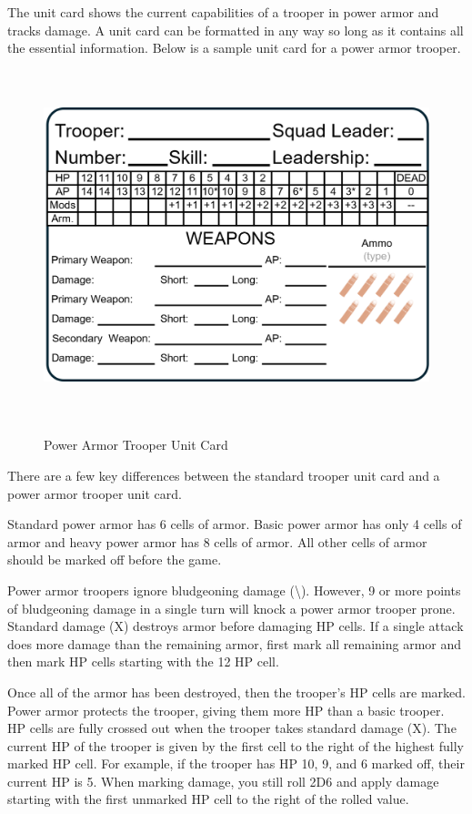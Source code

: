 The unit card shows the current capabilities of a trooper in power armor and tracks damage.
A unit card can be formatted in any way so long as it contains all the essential information.
Below is a sample unit card for a power armor trooper.

\begin{figure}[!h]
  \centering
  \includegraphics[alt='Sample Power Armor Trooper', width=5.63in, height=4in]{img/PowerArmorTrooper.png}
  \caption*{Power Armor Trooper Unit Card}
\end{figure}

There are a few key differences between the standard trooper unit card and a power armor trooper unit card.

Standard power armor has 6 cells of armor.
Basic power armor has only 4 cells of armor and heavy power armor has 8 cells of armor.
All other cells of armor should be marked off before the game.

Power armor troopers ignore bludgeoning damage (\textbackslash).
However, 9 or more points of bludgeoning damage in a single turn will knock a power armor trooper prone.
Standard damage (X) destroys armor before damaging HP cells.
If a single attack does more damage than the remaining armor, first mark all remaining armor and then mark HP cells starting with the 12 HP cell.

Once all of the armor has been destroyed, then the trooper's HP cells are marked.
Power armor protects the trooper, giving them more HP than a basic trooper.
HP cells are fully crossed out when the trooper takes standard damage (X).
The current HP of the trooper is given by the first cell to the right of the highest fully marked HP cell.
For example, if the trooper has HP 10, 9, and 6 marked off, their current HP is 5.
When marking damage, you still roll 2D6 and apply damage starting with the first unmarked HP cell to the right of the rolled value.


